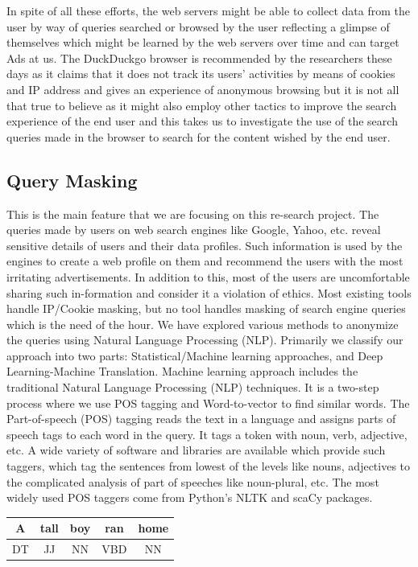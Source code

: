 \documentclass[10pt, a4paper, twocolumn]{article} %
\begin{document}
In spite of all these efforts, the web servers might be able to collect data from the user by way of queries searched or browsed by the user reflecting a glimpse of themselves which might be learned by the web servers over time and can target Ads at us. The DuckDuckgo browser is recommended by the researchers these days as it claims that it does not track its users’ activities by means of cookies and IP address and gives an experience of anonymous browsing but it is not all that true to believe as it might also employ other tactics to improve the search experience of the end user and this takes us to investigate the use of the search queries made in the browser to search for the content wished by the end user.

\subsection{Query Masking}
This is the main feature that we are focusing on this re-search project. The queries made by users on web search engines like Google, Yahoo, etc. reveal sensitive details of users and their data profiles. Such information is used by the engines to create a web profile on them and recommend the users with the most irritating advertisements. In addition to this, most of the users are uncomfortable sharing such in-formation and consider it a violation of ethics. Most existing tools handle IP/Cookie masking, but no tool handles masking of search engine queries which is the need of the hour. We have explored various methods to anonymize the queries using Natural Language Processing (NLP). Primarily we classify our approach into two parts: Statistical/Machine learning approaches, and Deep Learning-Machine Translation.\newline
Machine learning approach includes the traditional Natural Language Processing (NLP) techniques. It is a two-step process where we use POS tagging and Word-to-vector to find similar words. The Part-of-speech (POS) tagging reads the text in a language and assigns parts of speech tags to each word in the query. It tags a token with noun, verb, adjective, etc. A wide variety of software and libraries are available which provide such taggers, which tag the sentences from lowest of the levels like nouns, adjectives to the complicated analysis of part of speeches like noun-plural, etc. The most widely used POS taggers come from Python’s NLTK and scaCy packages.
\begin{center}
\begin{tabular}{ |c|c|c|c|c| } 
 \hline
 A & tall & boy & ran & home \\ 
 \hline
 DT & JJ & NN & VBD & NN\\ 
 \hline
\end{tabular}
\end{center}
\end{document}
